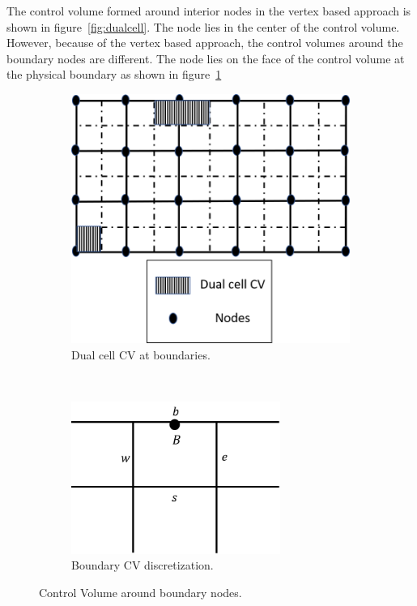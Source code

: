 The control volume formed around interior nodes in the vertex based approach is shown in figure~\ref{fig:dualcell}. The node lies in the center of the control volume. However, because of the vertex based approach, the control volumes around the boundary nodes are different. The node lies on the face of the control volume at the physical boundary as shown in figure~\ref{fig:bddualcell}
\begin{figure}[h]
    \centering
    \captionsetup{justification=centering}
    \begin{subfigure}[b]{0.45\textwidth}
    \centering
    \captionsetup{justification=centering}
        \includegraphics[width=.75\textwidth]{ch3_su2eqn/figures/boundary_dual_cell_nodes.png}
        \caption{Dual cell CV at boundaries.}
        \label{fig:bddualcell}
    \end{subfigure}
    ~ %
    \begin{subfigure}[b]{0.45\textwidth}
    \centering
    \captionsetup{justification=centering}
        \includegraphics[width=0.75\textwidth]{ch3_su2eqn/figures/boundary_2ddomain.png}
        \caption{Boundary CV discretization.}
        \label{fig:bd2dd}
    \end{subfigure}
    \caption{Control Volume around boundary nodes.}
\end{figure}
